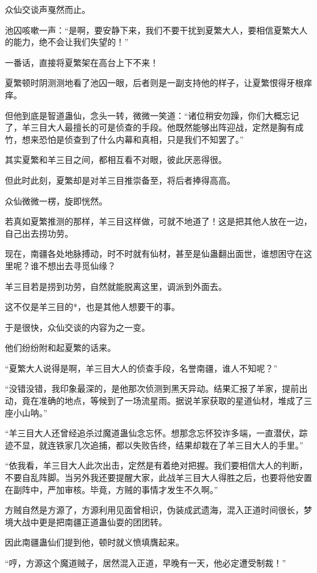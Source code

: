 \begin{this_body}
众仙交谈声戛然而止。

池囚咳嗽一声：“是啊，要安静下来，我们不要干扰到夏繁大人，要相信夏繁大人的能力，绝不会让我们失望的！”

一番话，直接将夏繁架在高台上下不来！

夏繁顿时阴测测地看了池囚一眼，后者则是一副支持他的样子，让夏繁恨得牙根痒痒。

但他到底是智道蛊仙，念头一转，微微一笑道：“诸位稍安勿躁，你们大概忘记了，羊三目大人最擅长的可是侦查的手段。他既然能够出阵迎战，定然是胸有成竹，想来恐怕是侦查到了什么内幕和真相，只是我们不知罢了。”

其实夏繁和羊三目之间，都相互看不对眼，彼此厌恶得很。

但此时此刻，夏繁却是对羊三目推崇备至，将后者捧得高高。

众仙微微一楞，旋即恍然。

若真如夏繁推测的那样，羊三目这样做，可就不地道了！这是把其他人放在一边，自己出去捞功劳。

现在，南疆各处地脉搏动，时不时就有仙材，甚至是仙蛊翻出面世，谁想困守在这里呢？谁不想出去寻觅仙缘？

羊三目若是捞到功劳，自然就能脱离这里，调派到外面去。

这不仅是羊三目的*，也是其他人想要干的事。

于是很快，众仙交谈的内容为之一变。

他们纷纷附和起夏繁的话来。

“夏繁大人说得是啊，羊三目大人的侦查手段，名誉南疆，谁人不知呢？”

“没错没错，我印象最深的，是他那次侦测到黑天异动。结果汇报了羊家，提前出动，竟在准确的地点，等候到了一场流星雨。据说羊家获取的星道仙材，堆成了三座小山呐。”

“羊三目大人还曾经追杀过魔道蛊仙念忘怀。想那念忘怀狡诈多端，一直潜伏，踪迹不显，就连铁家几次追捕，都以失败告终，结果却栽在了羊三目大人的手里。”

“依我看，羊三目大人此次出击，定然是有着绝对把握。我们要相信大人的判断，不要自乱阵脚。当另外我还要提醒大家，此战羊三目大人得胜之后，也要将他安置在副阵中，严加审核。毕竟，方贼的事情才发生不久啊。”

方贼自然是方源了，方源利用见面曾相识，伪装成武遗海，混入正道时间很长，梦境大战中更是把南疆正道蛊仙耍的团团转。

因此南疆蛊仙们提到他，顿时就义愤填膺起来。

“哼，方源这个魔道贼子，居然混入正道，早晚有一天，他必定遭受制裁！”


\end{this_body}
